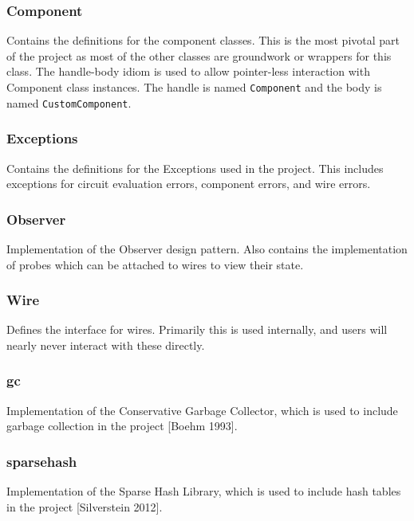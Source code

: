 \documentclass{article}
\newcommand{\ClassName}[1]{\texttt{#1}}
\begin{document}
\subsubsection{Component}

Contains the definitions for the component classes. This is the most pivotal part of the project as most of the other classes are groundwork or wrappers for this class. The handle-body idiom is used to allow pointer-less interaction with Component class instances. The handle is named \ClassName{Component} and the body is named \ClassName{CustomComponent}.

\subsubsection{Exceptions}

Contains the definitions for the Exceptions used in the project. This includes exceptions for circuit evaluation errors, component errors, and wire errors.

\subsubsection{Observer}

Implementation of the Observer design pattern. Also contains the implementation of probes which can be attached to wires to view their state.

\subsubsection{Wire}

Defines the interface for wires. Primarily this is used internally, and users will nearly never interact with these directly.

\subsubsection{gc}

Implementation of the Conservative Garbage Collector, which is used to include garbage collection in the project [Boehm 1993].

\subsubsection{sparsehash}

Implementation of the Sparse Hash Library, which is used to include hash tables in the project [Silverstein 2012].
\end{document}
